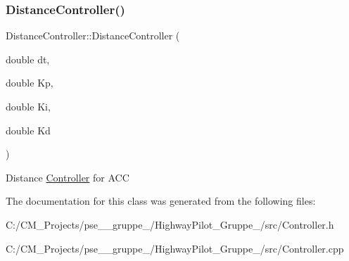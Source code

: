 \subsubsection{\texorpdfstring{DistanceController()}{DistanceController()}}
{\footnotesize\ttfamily Distance\+Controller\+::\+Distance\+Controller (\begin{DoxyParamCaption}\item[{double}]{dt,  }\item[{double}]{Kp,  }\item[{double}]{Ki,  }\item[{double}]{Kd }\end{DoxyParamCaption})}

Distance \mbox{\hyperlink{class_controller}{Controller}} for A\+CC 

The documentation for this class was generated from the following files\+:\begin{DoxyCompactItemize}
\item 
C\+:/\+C\+M\+\_\+\+Projects/pse\+\_\+\_\+gruppe\+\_/\+Highway\+Pilot\+\_\+\+Gruppe\+\_/src/Controller.\+h\item 
C\+:/\+C\+M\+\_\+\+Projects/pse\+\_\+\_\+gruppe\+\_/\+Highway\+Pilot\+\_\+\+Gruppe\+\_/src/Controller.\+cpp\end{DoxyCompactItemize}
